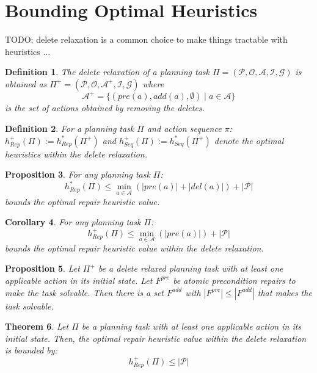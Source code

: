 \documentclass[twocolumn]{article}
\newcommand{\task}{\ensuremath{\Pi}\xspace}
\newcommand{\preds}{\ensuremath{\mathcal{P}}\xspace}
\newcommand{\acts}{\ensuremath{\mathcal{A}}\xspace}
\newcommand{\objects}{\ensuremath{\mathcal{O}}\xspace}
\newcommand{\init}{\ensuremath{\mathcal{I}}\xspace}
\newcommand{\goal}{\ensuremath{\mathcal{G}}\xspace}
\newcommand{\prename}{\ensuremath{pre}\xspace}
\newcommand{\addname}{\ensuremath{add}\xspace}
\newcommand{\delname}{\ensuremath{del}\xspace}
\newcommand{\pre}[1]{\ensuremath{\prename(#1)}\xspace}
\newcommand{\add}[1]{\ensuremath{\addname(#1)}\xspace}
\newcommand{\del}[1]{\ensuremath{\delname(#1)}\xspace}
\newcommand{\arity}[1]{\ensuremath{|#1|}}
\newcommand{\fixPre}{\ensuremath{F^{\prename}}\xspace}
\newcommand{\fixAdd}{\ensuremath{F^{\addname}}\xspace}
\newcommand{\someAct}{\ensuremath{a}\xspace}
\newcommand{\someActSeq}{\ensuremath{\pi}\xspace}
\newcommand{\optimalHeuristic}{\ensuremath{h^{*}_{Rep}}\xspace}
\newcommand{\optimalHeuristicSeq}{\ensuremath{h^{*}_{Seq}}\xspace}
\newcommand{\optimalHeuristicRel}{\ensuremath{h^{+}_{Rep}}\xspace}
\newcommand{\optimalHeuristicSeqRel}{\ensuremath{h^{+}_{Seq}}\xspace}
\newcommand{\relaxedActs}{\ensuremath{\acts^{+}}\xspace}
\newcommand{\relaxedTask}{\ensuremath{\task^{+}}\xspace}
\newtheorem{theorem}{Theorem}
\newtheorem{proposition}[theorem]{Proposition}
\newtheorem{corollary}[theorem]{Corollary}
\newtheorem{definition}[theorem]{Definition}
\begin{document}
	\section{Bounding Optimal Heuristics}
	
	TODO: delete relaxation is a common choice to make things tractable with heuristics ...
	
	\begin{definition}
		The delete relaxation of a planning task
		$\task = (\preds, \objects, \acts, \init, \goal)$
		is obtained as
		$\relaxedTask = (\preds, \objects, \relaxedActs, \init, \goal)$
		where 
		$$
		\relaxedActs = \{
		(\pre{\someAct}, \add{\someAct}, \emptyset) \mid \someAct \in \acts
		\}
		$$
		is the set of actions obtained by removing the deletes.
	\end{definition}
	
	\begin{definition}
		For a planning task \task and action sequence \someActSeq:
		$\optimalHeuristicRel(\task) := \optimalHeuristic(\relaxedTask)$
		and 
		$\optimalHeuristicSeqRel(\task) := \optimalHeuristicSeq(\relaxedTask)$
		denote the optimal heuristics within the delete relaxation.
	\end{definition}
	
	\begin{proposition}
		For any planning task \task:
		$$\optimalHeuristic(\task) \leq \min_{\someAct \in \acts}(\arity{\pre{\someAct}} + \arity{\del{\someAct}}) + \arity{\preds}$$
		bounds the optimal repair heuristic value.
	\end{proposition}
	
	\begin{corollary}
		For any planning task \task:
		$$\optimalHeuristicRel(\task) \leq \min_{\someAct \in \acts}(\arity{\pre{\someAct}}) + \arity{\preds}$$
		bounds the optimal repair heuristic value within the delete relaxation.
	\end{corollary}
	
	\begin{proposition}
		Let \relaxedTask be a delete relaxed planning task with at least one applicable action in its initial state.
		Let \fixPre be atomic precondition repairs to make the task solvable.
		Then there is a set \fixAdd with $\arity{\fixPre} \leq \arity{\fixAdd}$ that makes the task solvable.
	\end{proposition}
	
	
	\begin{theorem}
		Let \task be a planning task with at least one applicable action in its initial state.
		Then, the optimal repair heuristic value within the delete relaxation is bounded by:
		$$\optimalHeuristicRel(\task) \leq  \arity{\preds}$$
	\end{theorem}
	
\end{document}
